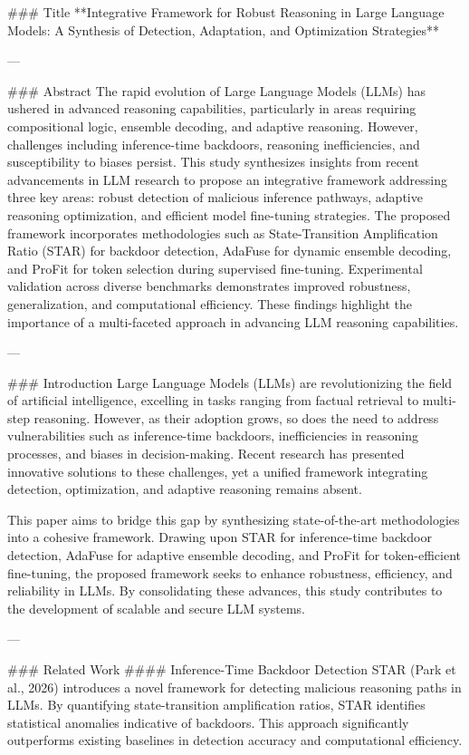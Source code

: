 ### Title
**Integrative Framework for Robust Reasoning in Large Language Models: A Synthesis of Detection, Adaptation, and Optimization Strategies**

---

### Abstract
The rapid evolution of Large Language Models (LLMs) has ushered in advanced reasoning capabilities, particularly in areas requiring compositional logic, ensemble decoding, and adaptive reasoning. However, challenges including inference-time backdoors, reasoning inefficiencies, and susceptibility to biases persist. This study synthesizes insights from recent advancements in LLM research to propose an integrative framework addressing three key areas: robust detection of malicious inference pathways, adaptive reasoning optimization, and efficient model fine-tuning strategies. The proposed framework incorporates methodologies such as State-Transition Amplification Ratio (STAR) for backdoor detection, AdaFuse for dynamic ensemble decoding, and ProFit for token selection during supervised fine-tuning. Experimental validation across diverse benchmarks demonstrates improved robustness, generalization, and computational efficiency. These findings highlight the importance of a multi-faceted approach in advancing LLM reasoning capabilities.

---

### Introduction
Large Language Models (LLMs) are revolutionizing the field of artificial intelligence, excelling in tasks ranging from factual retrieval to multi-step reasoning. However, as their adoption grows, so does the need to address vulnerabilities such as inference-time backdoors, inefficiencies in reasoning processes, and biases in decision-making. Recent research has presented innovative solutions to these challenges, yet a unified framework integrating detection, optimization, and adaptive reasoning remains absent.

This paper aims to bridge this gap by synthesizing state-of-the-art methodologies into a cohesive framework. Drawing upon STAR for inference-time backdoor detection, AdaFuse for adaptive ensemble decoding, and ProFit for token-efficient fine-tuning, the proposed framework seeks to enhance robustness, efficiency, and reliability in LLMs. By consolidating these advances, this study contributes to the development of scalable and secure LLM systems.

---

### Related Work
#### Inference-Time Backdoor Detection
STAR (Park et al., 2026) introduces a novel framework for detecting malicious reasoning paths in LLMs. By quantifying state-transition amplification ratios, STAR identifies statistical anomalies indicative of backdoors. This approach significantly outperforms existing baselines in detection accuracy and computational efficiency.

